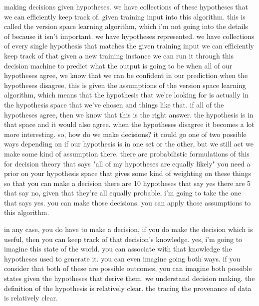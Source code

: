 making decisions given hypotheses.
we have collections of these hypotheses that we can efficiently keep track of.
given training input into this algorithm.
this is called the version space learning algorithm, which i'm not going into the details of because it isn't important.
we have hypotheses represented.
we have collections of every single hypothesis that matches the given training input
we can efficiently keep track of that
given a new training instance we can run it through this decision machine to predict what the output is going to be
when all of our hypotheses agree, we know that we can be confident in our prediction
when the hypotheses disagree, this is given the assumptions of the version space learning algorithm, which means that the hypothesis that we're looking for is actually in the hypothesis space that we've chosen and things like that.
if all of the hypotheses agree, then we know that this is the right answer.
the hypothesis is in that space and it would also agree.
when the hypotheses disagree it becomes a lot more interesting.
so, how do we make decisions?
it could go one of two possible ways depending on if our hypothesis is in one set or the other, but we still act
we make some kind of assumption there.
there are probabilistic formulations of this for decision theory that says "all of my hypotheses are equally likely"
you need a prior on your hypothesis space that gives some kind of weighting on these things so that you can make a decision
there are 10 hypotheses that say yes there are 5 that say no, given that they're all equally probable, i'm going to take the one that says yes.
you can make those decisions.
you can apply those assumptions to this algorithm.

in any case, you do have to make a decision, if you do make the decision which is useful, then you can keep track of that decision's knowledge.
yes, i'm going to imagine this state of the world.
you can associate with that knowledge the hypotheses used to generate it.
you can even imagine going both ways.
if you consider that both of these are possible outcomes, you can imagine both possible states given the hypotheses that derive them.
we understand decision making.
the definition of the hypothesis is relatively clear.
the tracing the provenance of data is relatively clear.

